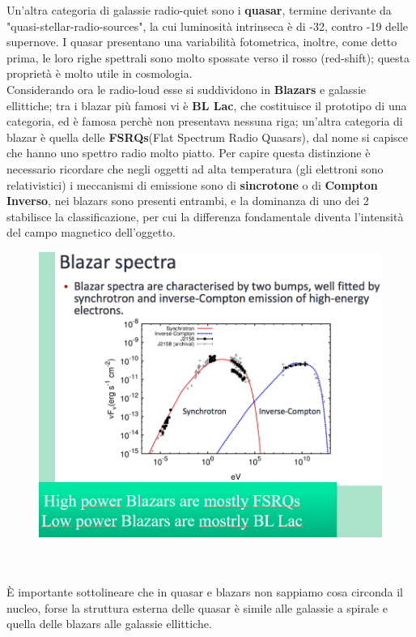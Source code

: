 \documentclass[a4paper,11pt]{article}
\begin{document}
Un'altra categoria di galassie radio-quiet sono i \textbf{quasar}, termine derivante da "quasi-stellar-radio-sources", la cui luminosità intrinseca è di -32, contro -19 delle supernove. I quasar presentano una variabilità fotometrica, inoltre, come detto prima, le loro righe spettrali sono molto spossate verso il rosso (red-shift); questa proprietà è molto utile in cosmologia.\\
Considerando ora le radio-loud esse si suddividono in \textbf{Blazars} e galassie ellittiche; tra i blazar più famosi vi è \textbf{BL Lac}, che costituisce il prototipo di una categoria, ed è famosa perchè non presentava nessuna riga; un'altra categoria di blazar è quella delle \textbf{FSRQs}(Flat Spectrum Radio Quasars), dal nome si capisce che hanno uno spettro radio molto piatto. Per capire questa distinzione è necessario ricordare che negli oggetti ad alta temperatura (gli elettroni sono relativistici) i meccanismi di emissione sono di \textbf{sincrotone} o di \textbf{Compton Inverso}, nei blazars sono presenti entrambi, e la dominanza di uno dei 2 stabilisce la classificazione, per cui la differenza fondamentale diventa l'intensità del campo magnetico dell'oggetto.\\
\begin{figure} [h]
        \centering
        \includegraphics[width=\textwidth]{immagini_lezioni12-12/47.png}
        \label{}
    \end{figure}\\
\\È importante sottolineare che in quasar e blazars non sappiamo cosa circonda il nucleo, forse la struttura esterna delle quasar è simile alle galassie a spirale e quella delle blazars alle galassie ellittiche.\\
\end{document}
